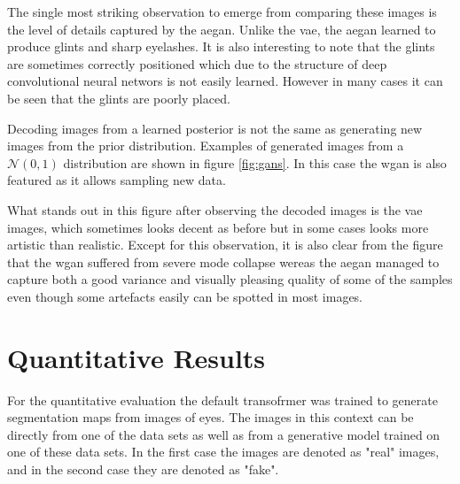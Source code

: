 The single most striking observation to emerge from comparing these images is the level of details captured by the \acrshort{aegan}. Unlike the \acrshort{vae}, the \acrshort{aegan} learned to produce glints and sharp eyelashes. It is also interesting to note that the glints are sometimes correctly positioned which due to the structure of deep convolutional neural networs is not easily learned. However in many cases it can be seen that the glints are poorly placed.

Decoding images from a learned posterior is not the same as generating new images from the prior distribution. Examples of generated images from a $\mathcal{N}(0, 1)$ distribution are shown in figure \ref{fig:gans}. In this case the \acrshort{wgan} is also featured as it allows sampling new data. 

What stands out in this figure after observing the decoded images is the \acrshort{vae} images, which sometimes looks decent as before but in some cases looks more artistic than realistic. Except for this observation, it is also clear from the figure that the \acrshort{wgan} suffered from severe mode collapse wereas the \acrshort{aegan} managed to capture both a good variance and visually pleasing quality of some of the samples even though some artefacts easily can be spotted in most images.



\section{Quantitative Results}
For the quantitative evaluation the default transofrmer was trained to generate segmentation maps from images of eyes. The images in this context can be directly from one of the data sets as well as from a generative model trained on one of these data sets. In the first case the images are denoted as "real" images, and in the second case they are denoted as "fake". 

